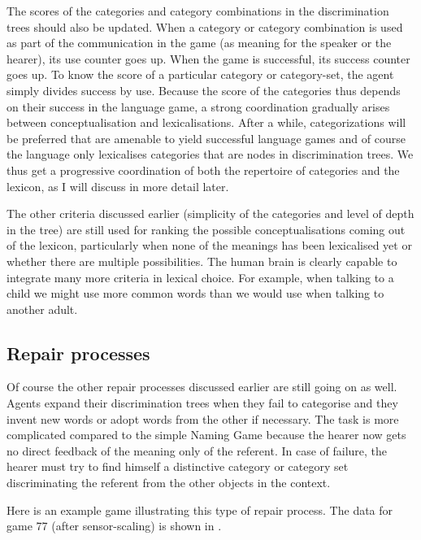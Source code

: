 The scores of the categories and category
combinations in the discrimination trees should also 
be updated. When a category or category combination
is used as part of the communication 
in the game (as meaning for the speaker or
the hearer), its use counter goes up. When 
the game is successful, its success counter 
goes up. To know the score of a particular 
category or category-set, the agent simply 
divides success by use. Because the score of the categories 
thus depends on their success in the 
language game, a strong coordination gradually 
arises between conceptualisation and 
lexicalisations. After a while, categorizations
will be preferred that are amenable to yield
successful language games and of course the 
language only lexicalises categories that are 
nodes in discrimination trees. 
We thus get a progressive coordination of 
both the repertoire of categories and the 
lexicon, as I will discuss in more detail later. 

The other criteria discussed earlier (simplicity of 
the categories and level of depth in the tree) are 
still used for ranking the possible conceptualisations
coming out of the lexicon, particularly when none
of the meanings has been lexicalised yet or whether
there are multiple possibilities. The human brain 
is clearly capable to integrate many more criteria
in lexical choice. For example, when talking to a 
child we might use more common words than we would use 
when talking to another adult. 

\subsection{Repair processes}

Of course the other repair processes discussed earlier 
are still going on as well. Agents expand their 
discrimination trees when they fail to categorise and 
they invent new words or adopt words from the 
other if necessary. The task is more complicated compared
to the simple Naming Game because the hearer now gets
no direct feedback of the meaning only of the referent. 
In case of failure, the hearer must try to find himself a distinctive
category or category set discriminating the 
referent from the other objects in the context.

Here is an example game illustrating this
type of repair process. 
The data for game 77 (after sensor-scaling)
is shown in . 



